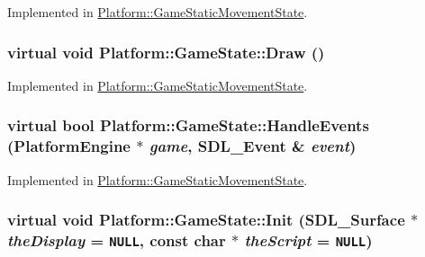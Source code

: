 Implemented in \hyperlink{class_platform_1_1_game_static_movement_state_4ae9849145c65e3a7276c545c5bbda18}{Platform::GameStaticMovementState}.\hypertarget{class_platform_1_1_game_state_a864d8c7f6094afd421a516729e3dd95}{
\subsubsection[{Draw}]{\setlength{\rightskip}{0pt plus 5cm}virtual void Platform::GameState::Draw ()}}
\label{d4/d4f/class_platform_1_1_game_state_a864d8c7f6094afd421a516729e3dd95}




Implemented in \hyperlink{class_platform_1_1_game_static_movement_state_8063dc783ff51732472010f23bed78e7}{Platform::GameStaticMovementState}.\hypertarget{class_platform_1_1_game_state_9edb3c6ed58b5a6c0b40cb07b01e5f31}{
\subsubsection[{HandleEvents}]{\setlength{\rightskip}{0pt plus 5cm}virtual bool Platform::GameState::HandleEvents ({\bf PlatformEngine} $\ast$ {\em game}, \/  SDL\_\-Event \& {\em event})}}
\label{d4/d4f/class_platform_1_1_game_state_9edb3c6ed58b5a6c0b40cb07b01e5f31}




Implemented in \hyperlink{class_platform_1_1_game_static_movement_state_aa0e9df9b7b26c71096d60debf92774b}{Platform::GameStaticMovementState}.\hypertarget{class_platform_1_1_game_state_37209d2617d04c6387a961cb2c8f3663}{
\subsubsection[{Init}]{\setlength{\rightskip}{0pt plus 5cm}virtual void Platform::GameState::Init (SDL\_\-Surface $\ast$ {\em theDisplay} = {\tt NULL}, \/  const char $\ast$ {\em theScript} = {\tt NULL})}}
\label{d4/d4f/class_platform_1_1_game_state_37209d2617d04c6387a961cb2c8f3663}




